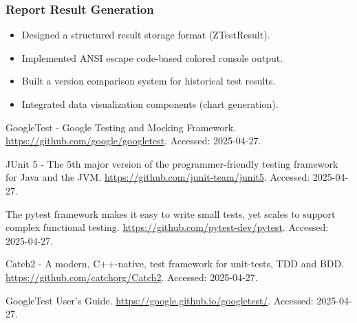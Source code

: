 \documentclass[english]{article}
\begin{document}
\subsubsection*{Report Result Generation}
\begin{itemize}[leftmargin=1em,itemsep=0.5ex]
    \item Designed a structured result storage format (ZTestResult).
    \item Implemented ANSI escape code-based colored console output.
    \item Built a version comparison system for historical test results.
    \item Integrated data visualization components (chart generation).
\end{itemize}
\newpage
{}
\begin{thebibliography}{99}

    GoogleTest - Google Testing and Mocking Framework.
    \url{https://github.com/google/googletest}.
    Accessed: 2025-04-27.

    JUnit 5 - The 5th major version of the programmer-friendly testing framework for Java and the JVM.
    \url{https://github.com/junit-team/junit5}.
    Accessed: 2025-04-27.

    The pytest framework makes it easy to write small tests, yet scales to support complex functional testing.
    \url{https://github.com/pytest-dev/pytest}.
    Accessed: 2025-04-27.

    Catch2 - A modern, C++-native, test framework for unit-tests, TDD and BDD.
    \url{https://github.com/catchorg/Catch2}.
    Accessed: 2025-04-27.

    GoogleTest User’s Guide.
    \url{https://google.github.io/googletest/}.
    Accessed: 2025-04-27.

\end{thebibliography}
\end{document}
